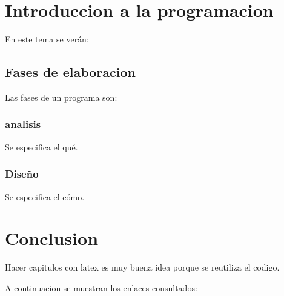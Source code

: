 \documentclass[14pt,a4paper]{book}
\author{Eric Martin}
\date{10 de noviembre de 2017}
\begin{document}
	\chapter{Introduccion a la programacion}
	 En este tema se verán: 
		\section{Fases de elaboracion}
		Las fases de un programa son:
		\subsection{analisis}
			Se especifica el qué.
		\subsection{Diseño}
			Se especifica el cómo.
	\chapter{Conclusion}
	Hacer capitulos con latex es muy buena idea porque se reutiliza el 					codigo.
		
	 
	 A continuacion se muestran los enlaces consultados:
			 
	
	
			   			
		
\end{document}
